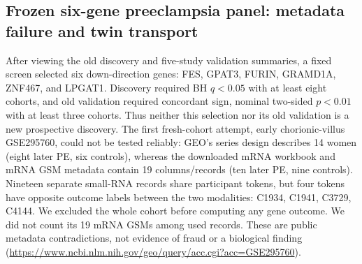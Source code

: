 \documentclass[11pt,a4paper]{article}
\begin{document}
\subsection{Frozen six-gene preeclampsia panel: metadata failure and twin transport}
After viewing the old discovery and five-study validation summaries, a fixed screen selected six down-direction genes: FES, GPAT3, FURIN, GRAMD1A, ZNF467, and LPGAT1. Discovery required BH $q<0.05$ with at least eight cohorts, and old validation required concordant sign, nominal two-sided $p<0.01$ with at least three cohorts. Thus neither this selection nor its old validation is a new prospective discovery. The first fresh-cohort attempt, early chorionic-villus GSE295760, could not be tested reliably: GEO's series design describes 14 women (eight later PE, six controls), whereas the downloaded mRNA workbook and mRNA GSM metadata contain 19 columns/records (ten later PE, nine controls). Nineteen separate small-RNA records share participant tokens, but four tokens have opposite outcome labels between the two modalities: C1934, C1941, C3729, C4144. We excluded the whole cohort before computing any gene outcome. We did not count its 19 mRNA GSMs among used records. These are public metadata contradictions, not evidence of fraud or a biological finding (\url{https://www.ncbi.nlm.nih.gov/geo/query/acc.cgi?acc=GSE295760}).
\end{document}

